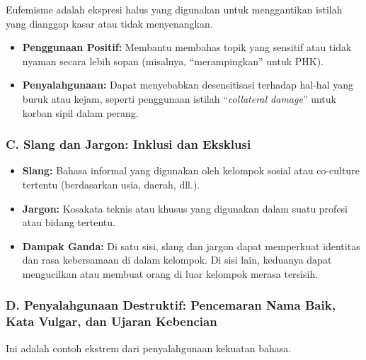 \documentclass[
  letterpaper,
  DIV=11,
  numbers=noendperiod]{scrreprt}
\begin{document}
Eufemisme adalah ekspresi halus yang digunakan untuk menggantikan
istilah yang dianggap kasar atau tidak menyenangkan.

\begin{itemize}
\item
  \textbf{Penggunaan Positif:} Membantu membahas topik yang sensitif
  atau tidak nyaman secara lebih sopan (misalnya, ``merampingkan'' untuk
  PHK).
\item
  \textbf{Penyalahgunaan:} Dapat menyebabkan desensitisasi terhadap
  hal-hal yang buruk atau kejam, seperti penggunaan istilah
  ``\emph{collateral damage}'' untuk korban sipil dalam perang.
\end{itemize}

\subsubsection{C. Slang dan Jargon: Inklusi dan
Eksklusi}\label{c.-slang-dan-jargon-inklusi-dan-eksklusi}

\begin{itemize}
\item
  \textbf{Slang:} Bahasa informal yang digunakan oleh kelompok sosial
  atau co-culture tertentu (berdasarkan usia, daerah, dll.).
\item
  \textbf{Jargon:} Kosakata teknis atau khusus yang digunakan dalam
  suatu profesi atau bidang tertentu.
\item
  \textbf{Dampak Ganda:} Di satu sisi, slang dan jargon dapat memperkuat
  identitas dan rasa kebersamaan di dalam kelompok. Di sisi lain,
  keduanya dapat mengucilkan atau membuat orang di luar kelompok merasa
  tersisih.
\end{itemize}

\subsubsection{D. Penyalahgunaan Destruktif: Pencemaran Nama Baik, Kata
Vulgar, dan Ujaran
Kebencian}\label{d.-penyalahgunaan-destruktif-pencemaran-nama-baik-kata-vulgar-dan-ujaran-kebencian}

Ini adalah contoh ekstrem dari penyalahgunaan kekuatan bahasa.
\end{document}

